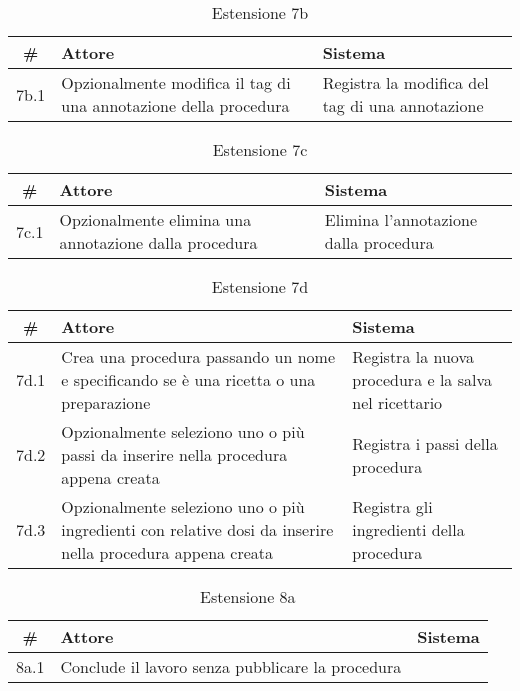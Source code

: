 \begin{table}[H]\centering\caption*{Estensione 7b}
      \small
      \begin{tabular}{|c|p{7cm}|p{6.24cm}|}
            \hline\bfseries \# & \bfseries Attore                                      & \bfseries Sistema                     \\\hline
            7b.1               & Opzionalmente modifica il tag di una annotazione della procedura & Registra la modifica del tag di una annotazione \\\hline
      \end{tabular}
\end{table}

\begin{table}[H]\centering\caption*{Estensione 7c}
      \small
      \begin{tabular}{|c|p{7cm}|p{6.24cm}|}
            \hline\bfseries \# & \bfseries Attore                                      & \bfseries Sistema                     \\\hline
            7c.1               & Opzionalmente elimina una annotazione dalla procedura & Elimina l’annotazione dalla procedura \\\hline
      \end{tabular}
\end{table}

\begin{table}[H]\centering\caption*{Estensione 7d}
      \small
      \begin{tabular}{|c|p{7cm}|p{6.24cm}|}
            \hline\bfseries \# & \bfseries Attore                                                                                          & \bfseries Sistema                                     \\\hline
            7d.1               & Crea una procedura passando un nome e specificando se è una ricetta o una preparazione      & Registra la nuova procedura e la salva nel ricettario \\\hline
            7d.2               & Opzionalmente seleziono uno o più passi da inserire nella procedura appena creata                         & Registra i passi della procedura                      \\\hline
            7d.3               & Opzionalmente seleziono uno o più ingredienti con relative dosi da inserire nella procedura appena creata & Registra gli ingredienti della procedura              \\\hline
      \end{tabular}
\end{table}

\begin{table}[H]\centering\caption*{Estensione 8a}
      \small
      \begin{tabular}{|c|p{7cm}|p{6.24cm}|}
            \hline\bfseries \# & \bfseries Attore                                 & \bfseries Sistema \\\hline
            8a.1               & Conclude il lavoro senza pubblicare la procedura &                   \\\hline
      \end{tabular}
\end{table}
\normalsize